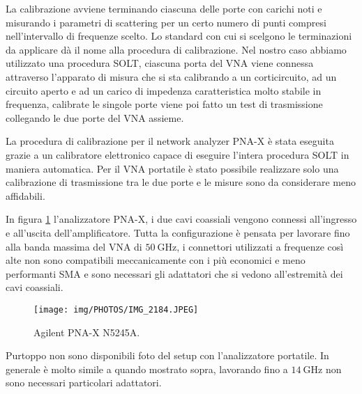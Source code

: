 \documentclass[12pt,oneside]{book}
\begin{document}
La calibrazione avviene terminando ciascuna delle porte con carichi noti e misurando i parametri di scattering per un certo numero di punti compresi nell'intervallo di frequenze scelto. Lo standard con cui si scelgono le terminazioni da applicare dà il nome alla procedura di calibrazione. Nel nostro caso abbiamo utilizzato una procedura SOLT, ciascuna porta del VNA viene connessa attraverso l'apparato di misura che si sta calibrando a un corticircuito, ad un circuito aperto e ad un carico di impedenza caratteristica molto stabile in frequenza, calibrate le singole porte viene poi fatto un test di trasmissione collegando le due porte del VNA assieme.

La procedura di calibrazione per il network analyzer PNA-X è stata eseguita grazie a un calibratore elettronico capace di eseguire l'intera procedura SOLT in maniera automatica. Per il VNA portatile è stato possibile realizzare solo una calibrazione di trasmissione tra le due porte e le misure sono da considerare meno affidabili.

In figura \ref{PNA-X} l'analizzatore PNA-X, i due cavi coassiali vengono connessi all'ingresso e all'uscita dell'amplificatore. Tutta la configurazione è pensata per lavorare fino alla banda massima del VNA di $\SI{50}{\giga\hertz}$, i connettori utilizzati a frequenze così alte non sono compatibili meccanicamente con i più economici e meno performanti SMA e sono necessari gli adattatori che si vedono all'estremità dei cavi coassiali.
\begin{figure}[!htbp]
    \centering
        \texttt{[image: img/PHOTOS/IMG\_2184.JPEG]}
        \caption{Agilent PNA-X N5245A.}
        \label{PNA-X}
\end{figure}

Purtoppo non sono disponibili foto del setup con l'analizzatore portatile. In generale è molto simile a quando mostrato sopra, lavorando fino a $\SI{14}{\giga\hertz}$ non sono necessari particolari adattatori.
\end{document}
